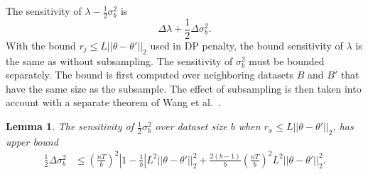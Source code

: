 \documentclass[english,twoside,openright]{HYgraduMLDS}
\newtheorem{lemma}{Lemma}[chapter]
\begin{document}
The sensitivity of \(\lambda - \frac{1}{2}\sigma_b^2\) is 
\[
    \Delta \lambda + \frac{1}{2}\Delta \sigma_b^2.
\]
With the bound \(r_j \leq L||\theta - \theta'||_2\) used in DP penalty, the 
bound sensitivity of \(\lambda\) is the same as without subsampling.
The sensitivity of \(\sigma_b^2\) must be bounded separately.
The bound is first computed over neighboring datasets \(B\) and \(B'\)
that have the same size as the subsample. The effect of subsampling is then
taken into account with a separate theorem of Wang et al.~\cite{WangBK19}.
\begin{lemma}\label{variance_sensitivity_lemma}
    The sensitivity of \(\frac{1}{2}\sigma_b^2\) over dataset size \(b\)
    when \(r_x \leq L||\theta - \theta'||_2\), has upper bound
    \begin{align*}
        \frac{1}{2}\Delta \sigma_b^2
        &\leq \left(\frac{nT}{b}\right)^2 \left|1 - \frac{1}{b}\right|
        L^2||\theta - \theta'||_2^2
        + \frac{2(b - 1)}{b}\left(\frac{nT}{b}\right)^2 L^2||\theta - \theta'||^2_2.
    \end{align*}
\end{lemma}
\end{document}
